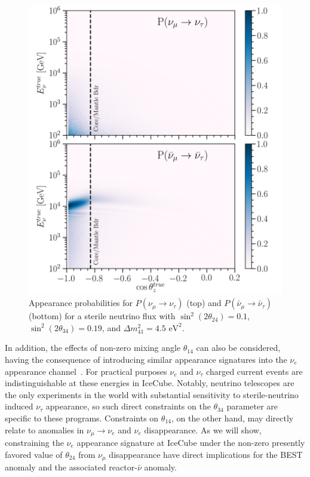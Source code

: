 \documentclass[main.tex]{subfiles}
\begin{document}
\begin{figure}
    \centering
    \includegraphics[width=0.8\linewidth]{figures/tau_odds.png}
    \caption{Appearance probabilities for $P(\nu_{\mu}\to\nu_{\tau})$ (top) and $P(\bar{\nu}_{\mu}\to\bar{\nu}_{\tau})$ (bottom) for a sterile neutrino flux with \(\sin^{2}(2\theta_{24})=0.1\), \(\sin^{2}(2\theta_{34})=0.19\), and \(\Delta m^{2}_{41}=4.5\text{ eV}^{2}\).}\label{fig:nunubar}
\end{figure}

In addition, the effects of non-zero mixing angle $\theta_{14}$ can also be considered, having the consequence of introducing similar appearance signatures into the $\nu_e$ appearance channel~\cite{wang2021search}. For practical purposes $\nu_e$ and $\nu_\tau$ charged current events are indistinguishable at these energies in IceCube.   Notably, neutrino telescopes are the only experiments in the world with substantial sensitivity to sterile-neutrino induced $\nu_\tau$ appearance, so such direct constraints on the $\theta_{34}$ parameter are specific to these programs. Constraints on $\theta_{14}$, on the other hand, may directly relate to anomalies in $\nu_\mu\rightarrow\nu_e$ and $\nu_e$ disappearance. As we will show, constraining the $\nu_e$ appearance signature at IceCube under the non-zero presently favored value of $\theta_{24}$ from $\nu_\mu$ disappearance have direct implications for the BEST anomaly and the associated reactor-$\bar{\nu}$ anomaly.
\end{document}
